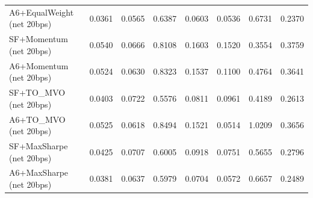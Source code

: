 \begin{table}[htbp]
\begin{tabular}{lrrrrrrr}
A6+EqualWeight (net 20bps) & 0.0361 & 0.0565 & 0.6387 & 0.0603 & 0.0536 & 0.6731 & 0.2370 \\
SF+Momentum (net 20bps) & 0.0540 & 0.0666 & 0.8108 & 0.1603 & 0.1520 & 0.3554 & 0.3759 \\
A6+Momentum (net 20bps) & 0.0524 & 0.0630 & 0.8323 & 0.1537 & 0.1100 & 0.4764 & 0.3641 \\
SF+TO_MVO (net 20bps) & 0.0403 & 0.0722 & 0.5576 & 0.0811 & 0.0961 & 0.4189 & 0.2613 \\
A6+TO_MVO (net 20bps) & 0.0525 & 0.0618 & 0.8494 & 0.1521 & 0.0514 & 1.0209 & 0.3656 \\
SF+MaxSharpe (net 20bps) & 0.0425 & 0.0707 & 0.6005 & 0.0918 & 0.0751 & 0.5655 & 0.2796 \\
A6+MaxSharpe (net 20bps) & 0.0381 & 0.0637 & 0.5979 & 0.0704 & 0.0572 & 0.6657 & 0.2489 \\
\bottomrule
\end{tabular}
\end{table}
